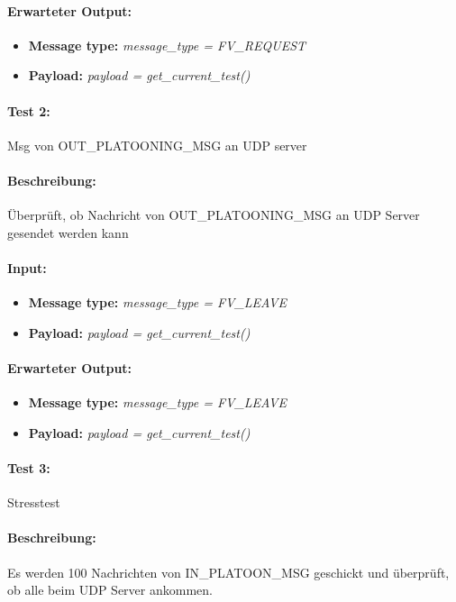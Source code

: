 \documentclass[a4paper, 12pt, titlepage]{scrartcl}
\begin{document}
{			\paragraph{Erwarteter Output:}
			\begin{itemize} \itemsep-0.5em
				\item \textbf{Message type:} \emph{message\_type = FV\_REQUEST}
				\item \textbf{Payload:} \emph{payload = get\_current\_test()}
			\end{itemize}
			
			\paragraph{Test 2:}{Msg von OUT\_PLATOONING\_MSG an UDP server}
			\paragraph{Beschreibung:} Überprüft, ob Nachricht von OUT\_PLATOONING\_MSG an UDP Server gesendet werden kann
			\paragraph{Input:}
			\begin{itemize} \itemsep-0.5em
				\item \textbf{Message type:} \emph{message\_type = FV\_LEAVE}
				\item \textbf{Payload:} \emph{payload = get\_current\_test()}
			\end{itemize}
			\paragraph{Erwarteter Output:}
			\begin{itemize} \itemsep-0.5em
				\item \textbf{Message type:} \emph{message\_type = FV\_LEAVE}
				\item \textbf{Payload:} \emph{payload = get\_current\_test()}
			\end{itemize}						
			
			\paragraph{Test 3:}{Stresstest}
			\paragraph{Beschreibung:} Es werden 100 Nachrichten von IN\_PLATOON\_MSG geschickt 	und überprüft, ob alle beim UDP Server ankommen.
}
\end{document}
